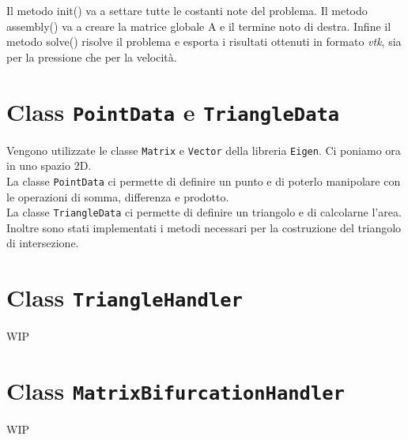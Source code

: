 Il metodo init() va a settare tutte le costanti note del problema.
Il metodo assembly() va a creare la matrice globale A e il termine noto di destra. 
Infine il metodo solve() risolve il problema e esporta i risultati ottenuti in formato \emph{vtk}, sia per la pressione che per la velocit\`{a}.


\section{Class \texttt{PointData} e \texttt{TriangleData}}

Vengono utilizzate le classe \texttt{Matrix} e \texttt{Vector} della libreria \texttt{Eigen}.
Ci poniamo ora in uno spazio 2D.\\
La classe \texttt{PointData} ci permette di definire un punto e di poterlo manipolare con le operazioni di somma, differenza e prodotto.\\
La classe \texttt{TriangleData} ci permette di definire un triangolo e di calcolarne l'area. Inoltre sono stati implementati i metodi necessari per la costruzione del triangolo di intersezione.

\section{Class \texttt{TriangleHandler}  }

WIP

\section{Class \texttt{MatrixBifurcationHandler}}

WIP
